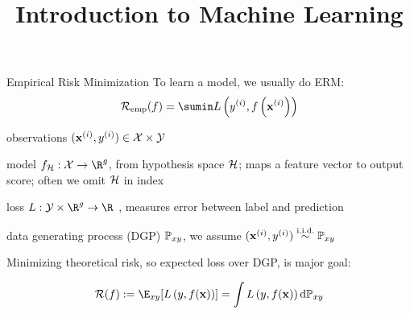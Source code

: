 \documentclass[11pt,compress,t,notes=noshow, xcolor=table]{beamer}
\title{Introduction to Machine Learning}
\begin{document}
    

\begin{frame}{Empirical Risk Minimization}
To learn a model, we usually do ERM:
$$\riskef = \sumin \Lxyi$$

\begin{itemizeM}[small]
\item observations $(\mathbf{x}^{(i)}, y^{(i)}) \in  \mathcal{X} \times \mathcal{Y}$
\item model $f_{\Hspace}:\Xspace \rightarrow \R^g$, 
from hypothesis space $\mathcal{H}$;
maps a feature vector to output score;
often we omit $\mathcal{H}$ in index 
\item loss $L:\Yspace\times\R^g\rightarrow\R$ ,
measures error between label and prediction
\item data generating process (DGP) $\mathbb{P}_{xy}$, we assume %
$(\mathbf{x}^{(i)}, y^{(i)})  \overset{\text{i.i.d.}}{\sim} \mathbb{P}_{xy}$  
\end{itemizeM}

Minimizing theoretical risk, so expected loss over DGP, is major goal:

$$ \risk (f) := \E_{xy} [\Lxy] = \int \Lxy \text{d}\Pxy $$

\end{frame}
\end{document}
